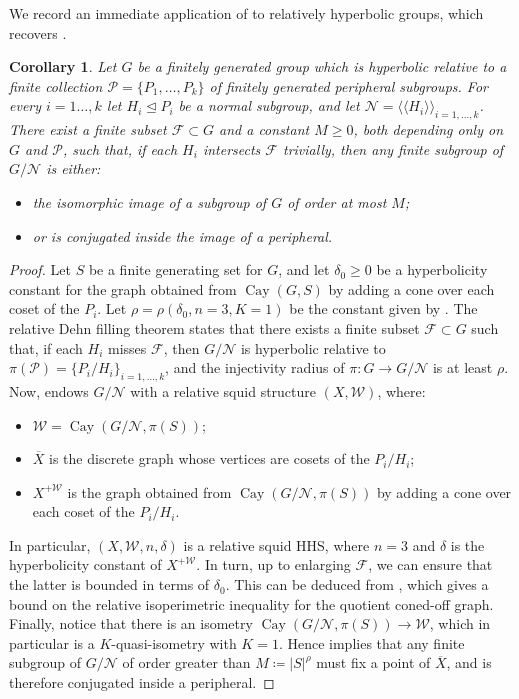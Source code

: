 \documentclass[svgnames]{amsart}
\theoremstyle{plain}
\newtheorem{cor}[thm]{Corollary}
\theoremstyle{definition}
\newcommand{\W}{\mathcal{W}}
\newcommand{\duaug}[2]{{#1}^{+{#2}}}
\newcommand{\squid}[1]{squid}
\newcommand{\Cay}[2]{\operatorname{Cay}\left(#1,#2\right)}
\newcommand{\ov}[1]{\overline{#1}}
\begin{document}
\noindent We record an immediate application of  to relatively hyperbolic groups, which recovers \cite[Lemma 4.3]{dahmaniguirardel}.

\begin{cor}\label{cor:df_of_relhyp:torsion} Let $G$ be a finitely generated group which is hyperbolic relative to a finite collection $\mathcal P=\{P_1,\ldots,P_k\}$ of finitely generated peripheral subgroups. For every $i=1\ldots, k$ let $H_i\unlhd P_i$ be a normal subgroup, and let $\mathcal N=\langle \langle H_i\rangle\rangle_{i=1,\ldots, k}$. There exist a finite subset $\mathcal F\subset G$ and a constant $M\ge 0$, both depending only on $G$ and $\mathcal P$, such that, if each $H_i$ intersects $\mathcal F$ trivially, then any finite subgroup of $G/\mathcal N$ is either:
\begin{itemize}
    \item the isomorphic image of a subgroup of $G$ of order at most $M$;
    \item or is conjugated inside the image of a peripheral.
\end{itemize}
\end{cor}

\begin{proof}
Let $S$ be a finite generating set for $G$, and let $\delta_0\ge 0$ be a hyperbolicity constant for the graph obtained from $\Cay{G}{S}$ by adding a cone over each coset of the $P_i$. Let $\rho=\rho(\delta_0,n=3,K=1)$ be the constant given by . The relative Dehn filling theorem \cite{Osin_DehnFill,GrovesManning} states that there exists a finite subset $\mathcal F\subset G$ such that, if each $H_i$ misses $\mathcal F$, then $G/\mathcal N$ is hyperbolic relative to $\pi(\mathcal P)= \{P_i/H_i\}_{i=1,\ldots, k}$, and the injectivity radius of $\pi\colon G\to G/\mathcal N$ is at least $\rho$. Now,  endows $G/\mathcal N$ with a relative \squid{} structure $(X,\W)$, where:
\begin{itemize}
\item $\W=\Cay{G/\mathcal N}{\pi(S)}$;
\item $\ov X$ is the discrete graph whose vertices are cosets of the $P_i/H_i$;
\item $\duaug{X}{\W}$ is the graph obtained from $\Cay{G/\mathcal N}{\pi(S)}$ by adding a cone over each coset of the $P_i/H_i$.
\end{itemize} In particular, $(X,\W, n,\delta)$ is a relative \squid{} HHS, where $n=3$ and $\delta$ is the hyperbolicity constant of $\duaug{X}{\W}$. In turn, up to enlarging $\mathcal F$, we can ensure that the latter is bounded in terms of $\delta_0$. This can be deduced from \cite[Lemma 5.3]{Osin_DehnFill}, which gives a bound on the relative isoperimetric inequality for the quotient coned-off graph.
 Finally, notice that there is an isometry $\Cay{G/\mathcal N}{\pi(S)}\to \W$, which in particular is a $K$-quasi-isometry with $K=1$. Hence  implies that any finite subgroup of $G/\mathcal N$ of order greater than $M\coloneq |S|^\rho$ must fix a point of $\ov X$, and is therefore conjugated inside a peripheral.
\end{proof}
\end{document}
